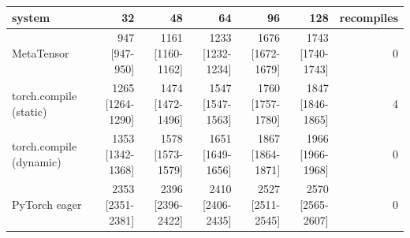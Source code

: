 \begin{tabular}{lrrrrrr}
\toprule
system & 32 & 48 & 64 & 96 & 128 & recompiles \\
\midrule
MetaTensor & 947 [947-950] & 1161 [1160-1162] & 1233 [1232-1234] & 1676 [1672-1679] & 1743 [1740-1743] & 0 \\
torch.compile (static) & 1265 [1264-1290] & 1474 [1472-1496] & 1547 [1547-1563] & 1760 [1757-1780] & 1847 [1846-1865] & 4 \\
torch.compile (dynamic) & 1353 [1342-1368] & 1578 [1573-1579] & 1651 [1649-1656] & 1867 [1864-1871] & 1966 [1966-1968] & 0 \\
PyTorch eager & 2353 [2351-2381] & 2396 [2396-2422] & 2410 [2406-2435] & 2527 [2511-2545] & 2570 [2565-2607] & 0 \\
\bottomrule
\end{tabular}
